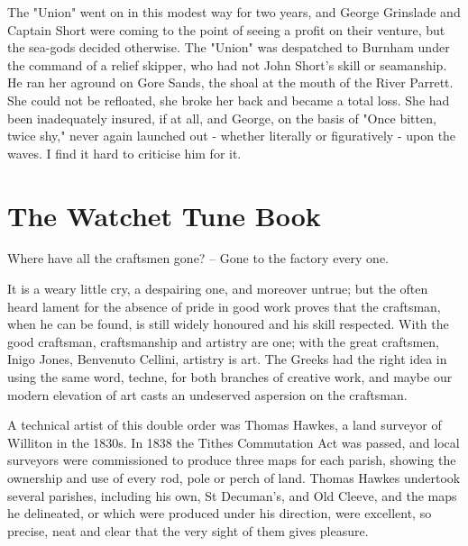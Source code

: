 The "Union" went on in this modest way for two years, and George Grinslade and	Captain Short were coming to the point of seeing a profit on their venture, but the sea-gods decided otherwise. The "Union" was	despatched to Burnham under the command of a relief skipper, who had not John Short's skill or seamanship. He ran her aground on Gore Sands, the shoal at the mouth of the River Parrett. She could not be refloated, she broke her back and became a total loss. She had been inadequately insured, if at all, and George, on the basis of "Once bitten, twice shy," never again launched out - whether literally or figuratively - upon the waves.
I find it hard to criticise him for it.
 
\section{The Watchet Tune Book}

Where have all the craftsmen gone? –
Gone to the factory every one.

It is a weary little cry, a despairing one, and moreover untrue; but the often heard lament for the absence of pride in good work proves that the craftsman, when he can be found, is still widely honoured and his skill respected. With the good craftsman, craftsmanship and artistry are one; with the great craftsmen, Inigo Jones, Benvenuto Cellini, artistry is art. The Greeks had the right idea in using the same word, techne, for both branches of creative work, and maybe our modern elevation of art casts an undeserved aspersion on the craftsman.

A technical artist of this double order was Thomas Hawkes, a land surveyor of Williton in the 1830s. In 1838 the Tithes Commutation Act was passed, and local surveyors were commissioned to produce three maps for each parish, showing the ownership and use of every rod, pole or perch of land. Thomas Hawkes undertook several parishes, including his own, St Decuman's, and Old Cleeve, and the maps he delineated, or which were produced under his direction, were excellent, so precise, neat and clear that the very sight of them gives pleasure.

